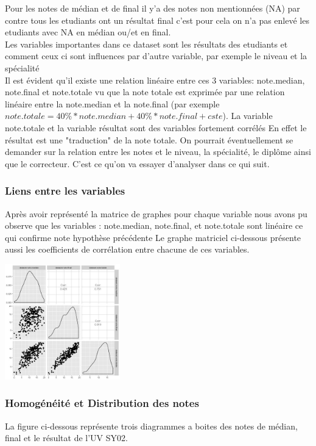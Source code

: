 \documentclass[10pt]{article}
\begin{document}
Pour les notes de médian et de final il y'a des notes non mentionnées (NA) par contre tous les etudiants ont un résultat final c'est pour cela on n'a pas enlevé les etudiants avec NA en médian ou/et en final.\\
Les variables importantes dans ce dataset sont les résultats des etudiants et comment ceux ci sont influences par d'autre variable, par exemple le niveau et la spécialité\\
Il est évident qu'il existe une relation linéaire entre ces 3 variables: note.median, note.final et note.totale vu que la note totale est exprimée par une relation linéaire entre la note.median et la note.final (par exemple $note.totale = 40\% * note.median + 40\% * note.final + cste$). La variable note.totale et la variable résultat sont des variables fortement corrélés En effet le résultat est une "traduction"  de la note totale. On pourrait éventuellement se demander sur la relation entre les notes et le niveau, la spécialité, le diplôme ainsi que le correcteur. C'est ce qu'on va essayer d'analyser dans ce qui suit. 

\subsubsection{Liens entre les variables}
Après avoir représenté la matrice de graphes pour chaque variable nous avons pu observe que les variables : note.median, note.final, et note.totale sont linéaire ce qui confirme note hypothèse précédente Le graphe matriciel ci-dessous présente aussi les coefficients de corrélation entre chacune de ces variables.

	\begin{center}
	\includegraphics[width=50mm]{Figures/Notes/corr_notes.jpg}
	\label{fig:multiplot_notes}
\end{center}


\subsubsection{Homogénéité et Distribution des notes}
La figure ci-dessous représente trois diagrammes a boites des notes de médian, final et le résultat de l'UV SY02. 
\end{document}
